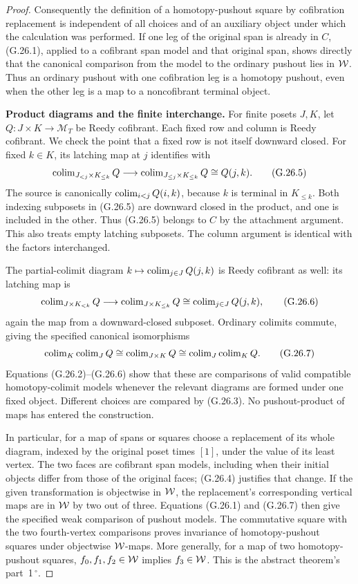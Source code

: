 \begin{proof}
Consequently the definition of a homotopy-pushout square by cofibration replacement is independent of all choices and of an auxiliary object under which the calculation was performed. If one leg of the original span is already in $C$, (G.26.1), applied to a cofibrant span model and that original span, shows directly that the canonical comparison from the model to the ordinary pushout lies in $\mathcal{W}$. Thus an ordinary pushout with one cofibration leg is a homotopy pushout, even when the other leg is a map to a noncofibrant terminal object.

\par\smallskip\noindent\textbf{Product diagrams and the finite interchange.}\quad
For finite posets $J,K$, let $Q:J\times K\to\mathcal M_T$ be Reedy cofibrant. Each fixed row and column is Reedy cofibrant. We check the point that a fixed row is not itself downward closed. For fixed $k\in K$, its latching map at $j$ identifies with
\[
\operatorname{colim}_{J_{<j}\times K_{\leq k}}Q
\longrightarrow
\operatorname{colim}_{J_{\leq j}\times K_{\leq k}}Q
\cong Q(j,k).                                                \tag{G.26.5}
\]
The source is canonically $\operatorname{colim}_{i<j}Q(i,k)$, because $k$ is terminal in $K_{\leq k}$. Both indexing subposets in (G.26.5) are downward closed in the product, and one is included in the other. Thus (G.26.5) belongs to $C$ by the attachment argument. This also treats empty latching subposets. The column argument is identical with the factors interchanged.

The partial-colimit diagram $k\mapsto\operatorname{colim}_{j\in J}Q(j,k)$ is Reedy cofibrant as well: its latching map is
\[
\operatorname{colim}_{J\times K_{<k}}Q
\longrightarrow
\operatorname{colim}_{J\times K_{\leq k}}Q
\cong\operatorname{colim}_{j\in J}Q(j,k),                                  \tag{G.26.6}
\]
again the map from a downward-closed subposet. Ordinary colimits commute, giving the specified canonical isomorphisms
\[
\operatorname{colim}_K\operatorname{colim}_J Q
\cong\operatorname{colim}_{J\times K}Q
\cong\operatorname{colim}_J\operatorname{colim}_K Q.                                     \tag{G.26.7}
\]
Equations (G.26.2)--(G.26.6) show that these are comparisons of valid compatible homotopy-colimit models whenever the relevant diagrams are formed under one fixed object. Different choices are compared by (G.26.3). No pushout-product of maps has entered the construction.

In particular, for a map of spans or squares choose a replacement of its whole diagram, indexed by the original poset times $[1]$, under the value of its least vertex. The two faces are cofibrant span models, including when their initial objects differ from those of the original faces; (G.26.4) justifies that change. If the given transformation is objectwise in $\mathcal{W}$, the replacement's corresponding vertical maps are in $\mathcal{W}$ by two out of three. Equations (G.26.1) and (G.26.7) then give the specified weak comparison of pushout models. The commutative square with the two fourth-vertex comparisons proves invariance of homotopy-pushout squares under objectwise $\mathcal{W}$-maps. More generally, for a map of two homotopy-pushout squares, $f_0,f_1,f_2\in\mathcal{W}$ implies $f_3\in\mathcal{W}$. This is the abstract theorem's part~1\,$^\circ$.


\end{proof}
